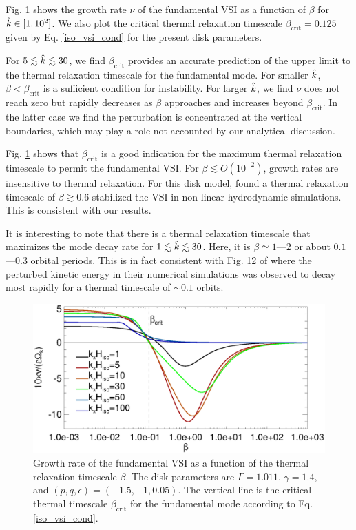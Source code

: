 Fig. \ref{bcrit_compare1} shows the growth rate $\nu$ of the
fundamental VSI as a function of $\beta$ for $\hat{k}\in[1,10^2]$. We
also plot the critical thermal relaxation timescale
$\beta_\mathrm{crit}=0.125$ given by Eq. \ref{iso_vsi_cond} for the present
disk parameters.

For $5\lesssim\hat{k}\lesssim30$, we find $\beta_\mathrm{crit}$ provides an
accurate prediction of the upper limit to the thermal relaxation 
timescale for  the fundamental mode. For smaller $\hat{k}$,
$\beta<\beta_\mathrm{crit}$ is a sufficient condition for
instability. For larger $\hat{k}$, we find $\nu$ does not reach zero but
rapidly decreases as $\beta$ approaches and increases beyond
$\beta_\mathrm{crit}$. In the latter case we find the perturbation is
concentrated at the vertical boundaries, which may play a role not
accounted by our analytical discussion. 

Fig. \ref{bcrit_compare1} shows that 
$\beta_\mathrm{crit}$ is a good indication for the maximum
thermal relaxation timescale to permit the fundamental VSI. For
$\beta\lesssim O(10^{-2})$, growth rates are insensitive to thermal
relaxation. For this disk model, \citeauthor{nelson13}
found a thermal relaxation timescale of $\beta\gtrsim 0.6$ stabilized
the VSI in non-linear hydrodynamic simulations. This is consistent
with our results.   

It is interesting to note that there is a thermal relaxation timescale that
maximizes the mode decay rate for $1\lesssim \hat{k} \lesssim 30$. Here,
it is $\beta\simeq1$---$2$ or about $0.1$---$0.3$ orbital
periods. This is in fact consistent with Fig. 12 of \cite{nelson13}
where the perturbed kinetic energy in their numerical simulations was
observed to decay most rapidly for a thermal timescale of $\sim 0.1$
orbits.     






 \begin{figure}
   \includegraphics[width=\linewidth]{figures/gcorr_compare2} 
   \caption{Growth rate of the fundamental VSI as
     a function of the thermal relaxation timescale $\beta$. The disk
     parameters are $\Gamma=1.011$, $\gamma=1.4$, and 
     $(p,q,\epsilon)=(-1.5,-1,0.05)$. The vertical line
     is the critical thermal timescale $\beta_\mathrm{crit}$ for the
     fundamental mode according to Eq. \ref{iso_vsi_cond}. 
     \label{bcrit_compare1}}   
 \end{figure} 

